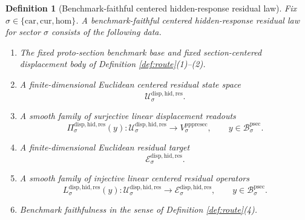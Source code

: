 \documentclass[11pt]{article}
\newcommand{\Car}{\mathrm{car}}
\newcommand{\Cur}{\mathrm{cur}}
\newcommand{\Hom}{\mathrm{hom}}
\newcommand{\ProtoSectionBody}[1]{\mathcal B_{#1}^{\mathrm{psec}}}
\newcommand{\PrePreProtoSectionVertical}[1]{V_{#1}^{\mathrm{pppresec}}}
\newcommand{\ResidualState}[1]{\mathcal U_{#1}^{\mathrm{disp,hid,res}}}
\newcommand{\ResidualTarget}[1]{\mathcal E_{#1}^{\mathrm{disp,hid,res}}}
\newcommand{\ResidualReadout}[1]{\Pi_{#1}^{\mathrm{disp,hid,res}}}
\newcommand{\ResidualOperator}[1]{L_{#1}^{\mathrm{disp,hid,res}}}
\newtheorem{definition}{Definition}
\begin{document}
\begin{definition}[Benchmark-faithful centered hidden-response residual law]
\label{def:residual}
Fix \(\sigma\in\{\Car,\Cur,\Hom\}\). A \emph{benchmark-faithful centered hidden-response residual law} for sector \(\sigma\) consists of the following data.
\begin{enumerate}
    \item The fixed proto-section benchmark base and fixed section-centered displacement body of Definition \ref{def:route}(1)--(2).
    \item A finite-dimensional Euclidean centered residual state space
    \[
    \ResidualState{\sigma}.
    \]
    \item A smooth family of surjective linear displacement readouts
    \[
    \ResidualReadout{\sigma}(y):
    \ResidualState{\sigma}\to\PrePreProtoSectionVertical{\sigma},
    \qquad
    y\in\ProtoSectionBody{\sigma}.
    \]
    \item A finite-dimensional Euclidean residual target
    \[
    \ResidualTarget{\sigma}.
    \]
    \item A smooth family of injective linear centered residual operators
    \[
    \ResidualOperator{\sigma}(y):
    \ResidualState{\sigma}\to\ResidualTarget{\sigma},
    \qquad
    y\in\ProtoSectionBody{\sigma}.
    \]
    \item Benchmark faithfulness in the sense of Definition \ref{def:route}(4).
\end{enumerate}
\end{definition}
\end{document}
